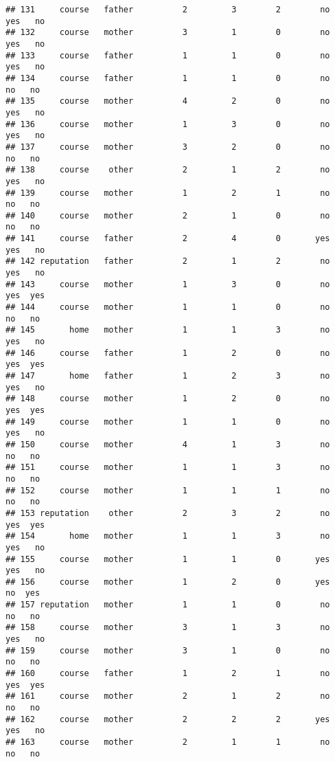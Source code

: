 \documentclass[
]{article}
\begin{document}
\begin{verbatim}
## 131     course   father          2         3        2        no    yes   no
## 132     course   mother          3         1        0        no    yes   no
## 133     course   father          1         1        0        no    yes   no
## 134     course   father          1         1        0        no     no   no
## 135     course   mother          4         2        0        no    yes   no
## 136     course   mother          1         3        0        no    yes   no
## 137     course   mother          3         2        0        no     no   no
## 138     course    other          2         1        2        no    yes   no
## 139     course   mother          1         2        1        no     no   no
## 140     course   mother          2         1        0        no     no   no
## 141     course   father          2         4        0       yes    yes   no
## 142 reputation   father          2         1        2        no    yes   no
## 143     course   mother          1         3        0        no    yes  yes
## 144     course   mother          1         1        0        no     no   no
## 145       home   mother          1         1        3        no    yes   no
## 146     course   father          1         2        0        no    yes  yes
## 147       home   father          1         2        3        no    yes   no
## 148     course   mother          1         2        0        no    yes  yes
## 149     course   mother          1         1        0        no    yes   no
## 150     course   mother          4         1        3        no     no   no
## 151     course   mother          1         1        3        no     no   no
## 152     course   mother          1         1        1        no     no   no
## 153 reputation    other          2         3        2        no    yes  yes
## 154       home   mother          1         1        3        no    yes   no
## 155     course   mother          1         1        0       yes    yes   no
## 156     course   mother          1         2        0       yes     no  yes
## 157 reputation   mother          1         1        0        no     no   no
## 158     course   mother          3         1        3        no    yes   no
## 159     course   mother          3         1        0        no     no   no
## 160     course   father          1         2        1        no    yes  yes
## 161     course   mother          2         1        2        no     no   no
## 162     course   mother          2         2        2       yes    yes   no
## 163     course   mother          2         1        1        no     no   no

\end{verbatim}
\end{document}
